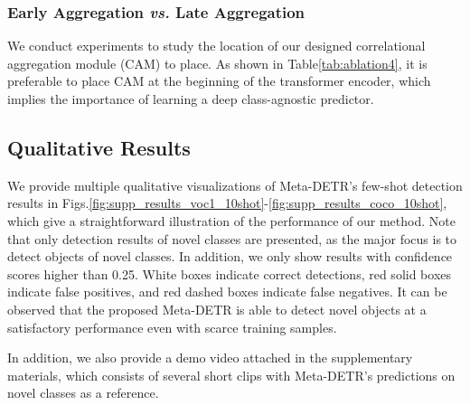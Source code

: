 \documentclass[letterpaper]{article} \usepackage{aaai22}  \usepackage{times}  \usepackage{helvet}  \usepackage{courier}  \usepackage[hyphens]{url}  \usepackage{graphicx} \urlstyle{rm} \def\UrlFont{\rm}  \usepackage{natbib}  \usepackage{caption} \DeclareCaptionStyle{ruled}{labelfont=normalfont,labelsep=colon,strut=off} \frenchspacing  \setlength{\pdfpagewidth}{8.5in}  \setlength{\pdfpageheight}{11in}  \usepackage{algorithm}
\begin{document}
\subsubsection{Early Aggregation \textit{vs.} Late Aggregation}
We conduct experiments to study the location of our designed correlational aggregation module (CAM) to place. As shown in Table\;\ref{tab:ablation4}, it is preferable to place CAM at the beginning of the transformer encoder, which implies the importance of learning a deep class-agnostic predictor.


\subsection{Qualitative Results}

We provide multiple qualitative visualizations of Meta-DETR's few-shot detection results in Figs.\;\ref{fig:supp_results_voc1_10shot}-\ref{fig:supp_results_coco_10shot}, which give a straightforward illustration of the performance of our method. Note that only detection results of novel classes are presented, as the major focus is to detect objects of novel classes. In addition, we only show results with confidence scores higher than 0.25. White boxes indicate correct detections, red solid boxes indicate false positives, and red dashed boxes indicate false negatives. It can be observed that the proposed Meta-DETR is able to detect novel objects at a satisfactory performance even with scarce training samples.

In addition, we also provide a demo video attached in the supplementary materials, which consists of several short clips with Meta-DETR's predictions on novel classes as a reference.
\end{document}
